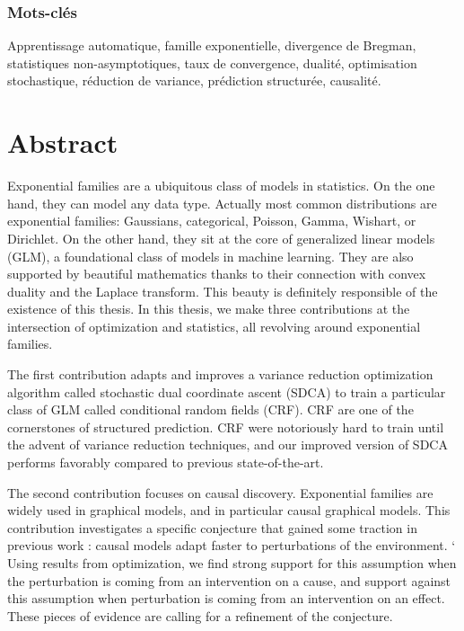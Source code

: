 \documentclass[12pt]{report} %
\numberwithin{equation}{chapter}
\numberwithin{table}{chapter}
\numberwithin{figure}{chapter}
\begin{document}
\subsection*{Mots-clés}
Apprentissage automatique, famille exponentielle, divergence de Bregman, statistiques non-asymptotiques, taux de convergence, dualité, optimisation stochastique, réduction de variance, prédiction structurée, causalité.


\chapter*{Abstract}

Exponential families are a ubiquitous class of models in statistics. 
On the one hand, they can model any data type.
Actually most common distributions are exponential families: Gaussians, categorical, Poisson, Gamma, Wishart, or Dirichlet. 
On the other hand, they sit at the core of generalized linear models (GLM), a foundational class of models in machine learning. 
They are also supported by beautiful mathematics thanks to their connection with convex duality and the Laplace transform.
This beauty is definitely responsible of the existence of this thesis.
In this thesis, we make three contributions at the intersection of optimization and statistics, all revolving around exponential families. 

The first contribution adapts and improves a variance reduction optimization algorithm called stochastic dual coordinate ascent (SDCA) to train a particular class of GLM called conditional random fields (CRF). CRF are one of the cornerstones of structured prediction. CRF were notoriously hard to train until the advent of variance reduction techniques, and our improved version of SDCA performs favorably compared to previous state-of-the-art.  

The second contribution focuses on causal discovery. 
Exponential families are widely used in graphical models, and in particular causal graphical models. 
This contribution investigates a specific conjecture that gained some traction in previous work : causal models adapt faster to perturbations of the environment. `
Using results from optimization, we find strong support for this assumption when the perturbation is coming from an intervention on a cause, and support against this assumption when perturbation is coming from an intervention on an effect.
 These pieces of evidence are calling for a refinement of  the conjecture.
\end{document}
